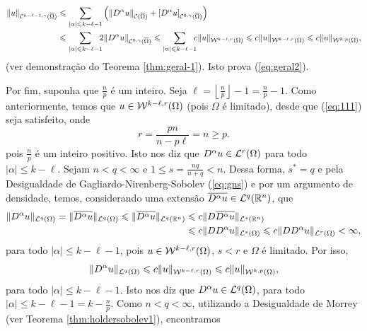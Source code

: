 \begin{prf}
\[\begin{aligned}
            \Vert u \Vert_{\mathcal{C}^{k-\ell-1,\gamma}(\overline\Omega)} &\leqslant \sum_{|\alpha| \leqslant k - \ell - 1} \left( \Vert D^\alpha u \Vert_{\mathcal{C}(\overline\Omega)} + [D^\alpha u]_{\mathcal{C}^{0,\gamma}(\overline\Omega)} \right)\\
            &\leqslant \sum_{|\alpha| \leqslant k - \ell - 1} \!\!\!2 \Vert D^\alpha u  \Vert_{\mathcal{C}^{0,\gamma}(\overline\Omega)} \leqslant \sum_{|\alpha| \leqslant k - \ell - 1} \!\!\!c \Vert u  \Vert_{\mathcal{W}^{k-\ell,r}(\Omega)} \leqslant c \Vert u \Vert_{\mathcal{W}^{k-\ell,r} (\Omega)} \leqslant c \Vert u \Vert_{\mathcal{W}^{k,p}(\Omega)},
        \end{aligned}
    \]
    (ver demonstração do Teorema \ref{thm:geral-1}). Isto prova (\ref{eq:geral2}).

    Por fim, suponha que $\frac{n}{p}$ é um inteiro. Seja $\ell = \left\lfloor \frac{n}{p} \right\rfloor - 1 = \frac{n}{p} - 1$.
    Como anteriormente, temos que $u \in \mathcal{W}^{k-\ell,r}(\Omega)$ (pois $\Omega$ é limitado), desde que (\ref{eq:111}) seja satisfeito, onde
    \[
        r = \frac{pn}{n - p\ell} = n \geqslant p.
    \]
    pois $\frac{n}{p}$ é um inteiro positivo.
    Isto nos diz que $D^\alpha u \in \mathcal{L}^r(\Omega)$ para todo $|\alpha| \leqslant k - \ell$.
    Sejam $n < q < \infty$ e $1 \leqslant s = \frac{nq}{n + q} < n$. Dessa forma, $s^* = q$ e pela Desigualdade de Gagliardo-Nirenberg-Sobolev (\ref{eq:gns})  e por um argumento de densidade, temos, considerando uma extensão $\overline{D^\alpha u} \in \mathcal{L}^q(\mathbb{R}^n)$, que
    \[
        \begin{aligned}
            \Vert D^\alpha u \Vert_{\mathcal{L}^q(\Omega)} = \Vert \overline{D^\alpha u}  \Vert_{\mathcal{L}^q(\Omega)} \leqslant \Vert \overline{D^\alpha u} \Vert_{\mathcal{L}^q(\mathbb{R}^n)} &\leqslant c \Vert D \overline{D^\alpha u} \Vert_{\mathcal{L}^s(\mathbb{R}^n)}\\ &\leqslant c \Vert D D^\alpha u \Vert_{\mathcal{L}^s(\Omega)} \leqslant c\Vert D D^\alpha u \Vert_{\mathcal{L}^r(\Omega)} < \infty,
        \end{aligned}
    \]
    para todo $|\alpha| \leqslant k - \ell - 1$, pois $u \in \mathcal{W}^{k-\ell,r}(\Omega)$, $s < r$ e $\Omega$ é limitado. Por isso,
    \[
        \Vert D^\alpha u \Vert_{\mathcal{L}^q(\Omega)} \leqslant c \Vert u \Vert_{\mathcal{W}^{k-\ell,r}(\Omega)} \leqslant c \Vert u \Vert_{\mathcal{W}^{k,p}(\Omega)},
    \]
    para todo $|\alpha| \leqslant k - \ell - 1$. Isto nos diz que $D^\alpha u \in \mathcal{L}^q(\Omega)$, para todo $|\alpha| \leqslant k - \ell - 1 = k - \frac{n}{p}$.
    Como $n < q < \infty$, utilizando a Desigualdade de Morrey (ver Teorema \ref{thm:holdersobolev1}), encontramos

\end{prf}
